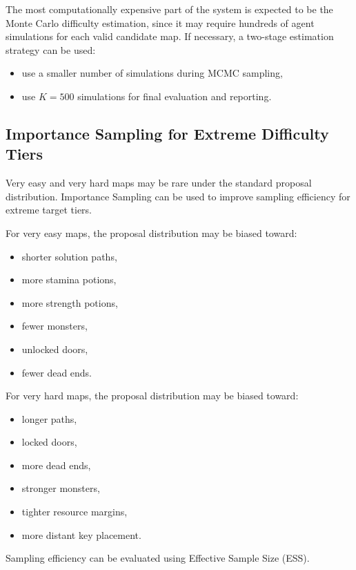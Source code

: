 \documentclass[11pt]{article}
\begin{document}
The most computationally expensive part of the system is expected to be the Monte Carlo difficulty estimation, since it may require hundreds of agent simulations for each valid candidate map. If necessary, a two-stage estimation strategy can be used:

\begin{itemize}[noitemsep]
    \item use a smaller number of simulations during MCMC sampling,
    \item use $K = 500$ simulations for final evaluation and reporting.
\end{itemize}

\subsection{Importance Sampling for Extreme Difficulty Tiers}

Very easy and very hard maps may be rare under the standard proposal distribution. Importance Sampling can be used to improve sampling efficiency for extreme target tiers.

For very easy maps, the proposal distribution may be biased toward:

\begin{itemize}[noitemsep]
    \item shorter solution paths,
    \item more stamina potions,
    \item more strength potions,
    \item fewer monsters,
    \item unlocked doors,
    \item fewer dead ends.
\end{itemize}

For very hard maps, the proposal distribution may be biased toward:

\begin{itemize}[noitemsep]
    \item longer paths,
    \item locked doors,
    \item more dead ends,
    \item stronger monsters,
    \item tighter resource margins,
    \item more distant key placement.
\end{itemize}

Sampling efficiency can be evaluated using Effective Sample Size (ESS).
\end{document}
